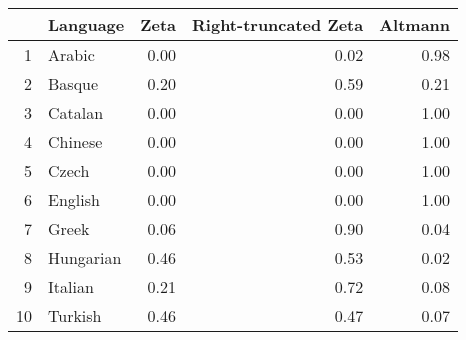 \begin{table}[ht]
\centering
\begin{tabular}{rlrrr}
  \hline
 & Language & Zeta & Right-truncated Zeta & Altmann \\ 
  \hline
1 & Arabic & 0.00 & 0.02 & 0.98 \\ 
  2 & Basque & 0.20 & 0.59 & 0.21 \\ 
  3 & Catalan & 0.00 & 0.00 & 1.00 \\ 
  4 & Chinese & 0.00 & 0.00 & 1.00 \\ 
  5 & Czech & 0.00 & 0.00 & 1.00 \\ 
  6 & English & 0.00 & 0.00 & 1.00 \\ 
  7 & Greek & 0.06 & 0.90 & 0.04 \\ 
  8 & Hungarian & 0.46 & 0.53 & 0.02 \\ 
  9 & Italian & 0.21 & 0.72 & 0.08 \\ 
  10 & Turkish & 0.46 & 0.47 & 0.07 \\ 
   \hline
\end{tabular}
\end{table}
